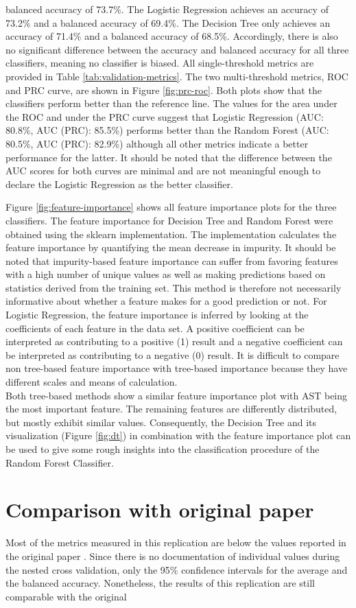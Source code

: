 balanced accuracy of 73.7\%. The Logistic Regression achieves an accuracy of 
73.2\% and a balanced accuracy of 69.4\%. The Decision Tree only achieves an 
accuracy of 71.4\% and a balanced accuracy of 68.5\%. Accordingly, there is 
also no significant difference between the accuracy and balanced accuracy for 
all three classifiers, meaning no classifier is biased.
All single-threshold metrics are provided in Table \ref{tab:validation-metrics}.
The two multi-threshold metrics, ROC and PRC curve, are shown in Figure 
\ref{fig:prc-roc}. Both plots show that the classifiers perform better than the 
reference line. The values for the area under the ROC and under the PRC curve 
suggest that Logistic Regression (AUC: 80.8\%, AUC (PRC): 85.5\%) performs 
better than the Random Forest (AUC: 80.5\%, AUC (PRC): 82.9\%) although all 
other metrics indicate a better performance for the latter. It 
should be noted that the difference between the AUC scores for both curves are 
minimal and are not meaningful enough to declare the Logistic Regression as the 
better classifier.
\par
Figure \ref{fig:feature-importance} shows all feature importance plots for the 
three classifiers. The feature importance for Decision Tree and Random Forest 
were obtained using the sklearn implementation. The implementation calculates 
the feature importance by quantifying the mean decrease in impurity. 
It should be noted that impurity-based feature importance can suffer 
from favoring features with a high number of unique values as well as making 
predictions based on statistics derived from the training set. This method is 
therefore not necessarily informative about whether a feature makes for a 
good prediction or not.\cite{RN178}
For Logistic Regression, the feature importance is inferred by looking at the 
coefficients of each feature in the data set. A positive coefficient can be 
interpreted as contributing to a positive (1) result and a negative coefficient 
can be interpreted as contributing to a negative (0) result.
It is difficult to compare non tree-based feature importance with tree-based 
importance because they have different scales and means of calculation.
\\
Both tree-based methods show a similar feature importance plot with AST being 
the most important feature. The remaining features are differently distributed, 
but mostly exhibit similar values. Consequently, the Decision Tree and its 
visualization (Figure \ref{fig:dt}) in combination with the feature 
importance plot can be used to give some rough insights into the classification 
procedure of the Random Forest Classifier.

\section{Comparison with original paper}
Most of the metrics measured in this replication are below the values reported 
in the original paper \cite{RN127}. Since there is no documentation of 
individual values during the nested cross validation, only the 95\% confidence 
intervals for the average and the balanced accuracy. Nonetheless, the results 
of this replication are still comparable with the original
